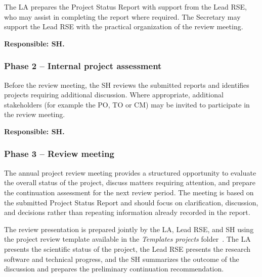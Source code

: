 The LA prepares the Project Status Report with support from the Lead RSE, who may assist in completing the report 
where required. The Secretary may support the Lead RSE with the practical organization of the review meeting. 

\textbf{Responsible: SH.} 

\subsubsection{Phase 2 -- Internal project assessment} 
Before the review meeting, the SH reviews the submitted reports and identifies projects requiring additional discussion. 
Where appropriate, additional stakeholders (for example the PO, TO or CM) may be invited to participate in the review 
meeting.

\textbf{Responsible: SH.} 

\subsubsection{Phase 3 -- Review meeting} 

The annual project review meeting provides a structured opportunity to evaluate the overall status of the project,
discuss matters requiring attention, and prepare the continuation assessment for the next review period. The meeting is
based on the submitted Project Status Report and should focus on clarification, discussion, and decisions rather than
repeating information already recorded in the report.

The review presentation is prepared jointly by the LA, Lead RSE, and SH using the project review template available in
the \textit{Templates projects} folder~\cite{proj-portfolio}. The LA presents the scientific status of the project, the
Lead RSE presents the research software and technical progress, and the SH summarizes the outcome of the discussion and
prepares the preliminary continuation recommendation.

